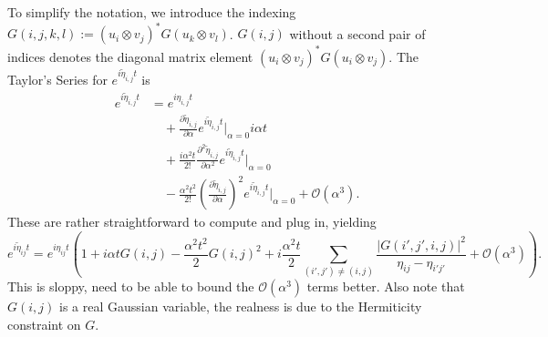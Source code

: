 \documentclass{article}
\newcommand{\parens}[1]{\left( #1 \right)}
\newcommand{\abs}[1]{\left| #1 \right|}
\newcommand{\bigo}[1]{\mathcal{O}\left( #1 \right)}
\begin{document}
To simplify the notation, we introduce the indexing $G(i,j,k,l) := (u_i \otimes v_j)^* G (u_k \otimes v_l)$. $G(i,j)$ without a second pair of indices denotes the diagonal matrix element $(u_i \otimes v_j)^* G (u_i \otimes v_j)$. The Taylor's Series for $e^{i \widetilde{\eta}_{i,j} t}$ is
\begin{align}
    e^{i \widetilde{\eta}_{i,j} t} &= e^{i \eta_{i,j} t} \\
    &\quad + \frac{\partial \widetilde{\eta}_{i,j}}{\partial \alpha} e^{i \widetilde{\eta}_{i,j}t} \bigg|_{\alpha = 0} i \alpha t \\
    &\quad + \frac{ i\alpha^2 t}{2!} \frac{\partial^2 \widetilde{\eta}_{i,j}}{\partial \alpha^2} e^{i \widetilde{\eta}_{i,j}t}\bigg|_{\alpha=0} \\
    &\quad - \frac{\alpha^2 t^2}{2!} \parens{\frac{\partial \widetilde{\eta}_{i,j}}{\partial \alpha}}^2 e^{i \widetilde{\eta}_{i,j} t} \bigg|_{\alpha=0} + \bigo{\alpha^3} .
\end{align}
These are rather straightforward to compute and plug in, yielding
\begin{equation}
    e^{i \widetilde{\eta}_{ij} t} = e^{i \eta_{ij} t}\parens{1 + i \alpha t G(i,j) - \frac{\alpha^2 t^2}{2} G(i,j)^2 + i \frac{\alpha^2 t}{2} \sum_{(i',j') \neq (i,j)}\frac{\abs{G(i',j',i,j)}^2}{\eta_{ij} - \eta_{i' j'}} + \bigo{\alpha^3}}.
\end{equation}
This is sloppy, need to be able to bound the $\bigo{\alpha^3}$ terms better. Also note that $G(i,j)$ is a real Gaussian variable, the realness is due to the Hermiticity constraint on $G$. 
\end{document}
